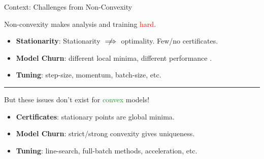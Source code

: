 \documentclass[usenames,dvipsnames,mathserif,notheorems]{beamer}
\newcommand{\horizontalrule}{
	{
			\vspace{-0.5em}
			\center \rule{\textwidth}{0.1em}
			\vspace{-0.2em}
		}
}
\newcommand{\red}[1]{\textcolor{Red}{#1}}
\newcommand{\green}[1]{\textcolor{ForestGreen}{#1}}
\begin{document}
\begin{frame}{Context: Challenges from Non-Convexity}
	\begin{center}
		\Large
		Non-convexity makes analysis and training \red{hard}.
	\end{center}

	\pause
	\begin{itemize}
		\item \textbf{Stationarity}: Stationarity \( \centernot \implies \) optimality.
		      Few/no certificates.

		      \pause
		\item \textbf{Model Churn}: different local minima,
		      different performance \citep{henderson2018deep}.

		      \pause
		\item \textbf{Tuning}: step-size, momentum, batch-size, etc.
	\end{itemize}

	\pause
	\horizontalrule

	\vspace{-2ex}

	\begin{center}
		\Large
		But these issues don't exist for \green{convex} models!
	\end{center}

	\pause
	\begin{itemize}
		\item \textbf{Certificates}: stationary points are global minima.

		      \pause
		\item \textbf{Model Churn}: strict/strong convexity gives uniqueness.

		      \pause
		\item \textbf{Tuning}: line-search, full-batch methods, acceleration, etc.
	\end{itemize}

\end{frame}
\end{document}
